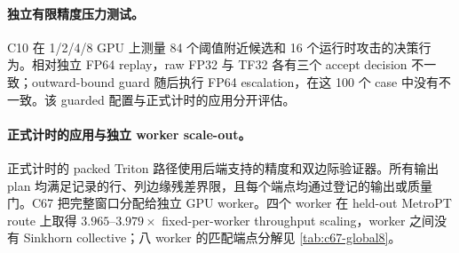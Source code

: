 

\paragraph{独立有限精度压力测试。}
C10 在 1/2/4/8 GPU 上测量 84 个阈值附近候选和 16 个运行时攻击的决策行为。相对独立 FP64 replay，raw FP32 与 TF32 各有三个 accept decision 不一致；outward-bound guard 随后执行 FP64 escalation，在这 100 个 case 中没有不一致。该 guarded 配置与正式计时的应用分开评估。

\paragraph{正式计时的应用与独立 worker scale-out。}
正式计时的 packed Triton 路径使用后端支持的精度和双边际验证器。所有输出 plan 均满足记录的行、列边缘残差界限，且每个端点均通过登记的输出或质量门。C67 把完整窗口分配给独立 GPU worker。四个 worker 在 held-out MetroPT route 上取得 $3.965$--$3.979\times$ fixed-per-worker throughput scaling，worker 之间没有 Sinkhorn collective；八 worker 的匹配端点分解见 \cref{tab:c67-global8}。
